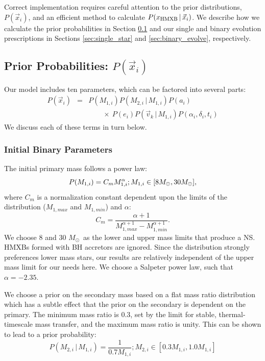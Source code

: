 \documentclass[usenatbib]{mnras}
\newcommand{\given}{\,|\,}
\newcommand{\Msun}{\ifmmode {M_{\odot}}\else${M_{\odot}}$\fi}
\begin{document}
Correct implementation requires careful attention to the prior distributions, $P(\vec{x}_i)$, and an efficient method to calculate $P(x_{\rm HMXB} \given \vec{x}_i)$. We describe how we calculate the prior probabilities in Section \ref{sec:priors} and our single and binary evolution prescriptions in Sections \ref{sec:single_star} and \ref{sec:binary_evolve}, respectively.




\subsection{Prior Probabilities: $P(\vec{x}_i)$} \label{sec:priors}

Our model includes ten parameters, which can be factored into several parts:
\begin{eqnarray}
P(\vec{x}_i) &=& P(M_{1,i}) P(M_{2,i}\given M_{1,i}) P(a_i) \nonumber \\
 & & \qquad  \times\ P(e_i) P(\vec{v}_k \given M_{1,i}) P(\alpha_i, \delta_i, t_i)
\end{eqnarray}
We discuss each of these terms in turn below.

\subsubsection{Initial Binary Parameters}

The initial primary mass follows a power law:
\begin{equation}
P(M_{1,i}) = C_m M_{1,i}^{\alpha}; M_{1,i} \in [8\Msun, 30\Msun],
\end{equation}
where $C_m$ is a normalization constant dependent upon the limits of the distribution ($M_{1,max}$ and $M_{1,min}$) and $\alpha$:
\begin{equation}
C_m = \frac{\alpha + 1}{M_{1,max}^{\alpha+1} - M_{1,min}^{\alpha+1}}.
\end{equation}
We choose 8 and 30 \Msun\ as the lower and upper mass limits that produce a NS. HMXBs formed with BH accretors are ignored. Since the distribution strongly preferences lower mass stars, our results are relatively independent of the upper mass limit for our needs here. We choose a Salpeter power law, such that $\alpha = -2.35$. 

We choose a prior on the secondary mass based on a flat mass ratio distribution which has a subtle effect that the prior on the secondary is dependent on the primary. The minimum mass ratio is 0.3, set by the limit for stable, thermal-timescale mass transfer, and the maximum mass ratio is unity. This can be shown to lead to a prior probability:
\begin{equation}
P(M_{2,i} \given M_{1,i}) = \frac{1}{0.7 M_{1,i}}; M_{2,i} \in [0.3 M_{1,i}, 1.0 M_{1,i}]
\end{equation}
\end{document}
